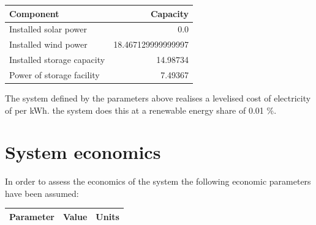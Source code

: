 \documentclass{article}
\begin{document}
\begin{multicols*}{2}
\begin{center}

\begin{tabular}{|l|r|}

\hline Component&Capacity\\ \hline 

Installed solar power&0.0\\ 

Installed wind power&18.467129999999997\\ 

Installed storage capacity&14.98734\\ 

Power of storage facility&7.49367\\ 

\hline

\end{tabular}

\label{tab:systemlayout}

\end{center}


\vspace{2.5mm}

The system defined by the parameters above realises a levelised cost of electricity of  per kWh. the system does this at a renewable energy share of 0.01 \%. 

\section*{System economics}

In order to assess the economics of the system the following economic parameters have been assumed: 

\begin{center}

\begin{tabular}{|l|r|c|}

\hline Parameter&Value&Units\\ \hline 

\hline

\end{tabular}

\label{tab:econinputtable}

\end{center}


\vspace{2.5mm}


\end{multicols*}
\end{document}
